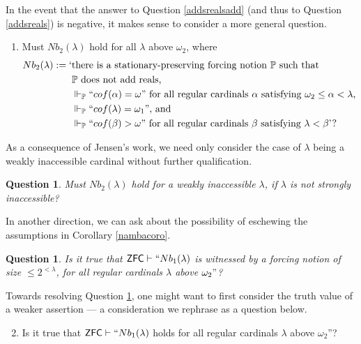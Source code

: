 \documentclass[12pt, twoside]{memoir}
\numberwithin{equation}{section}
\newtheorem{ques}[thm]{Question}
\theoremstyle{definition}
\theoremstyle{remark}
\theoremstyle{definition}
\theoremstyle{definition}
\theoremstyle{definition}
\theoremstyle{remark}
\begin{document}
In the event that the answer to Question \ref{addsrealsadd} (and thus to Question \ref{addsreals}) is negative, it makes sense to consider a more general question.

\begin{enumerate}[label=(Q\arabic*)]
    \item Must $Nb_2(\lambda)$ hold for all $\lambda$ above $\omega_2$, where 
    \begin{align*}
        Nb_2(\lambda) := \text{`} & \text{there is a stationary-preserving forcing notion } \mathbb{P} \text{ such that} \\ 
        & \mathbb{P} \text{ does not add reals,} \\
        & \Vdash_{\mathbb{P}} ``cof(\alpha) = \omega" \text{ for all regular cardinals } \alpha \text{ satisfying } \omega_2 \leq \alpha < \lambda \text{,} \\
        & \Vdash_{\mathbb{P}} ``cof(\lambda) = \omega_1" \text{, and} \\
        & \Vdash_{\mathbb{P}} ``cof(\beta) > \omega" \text{ for all regular cardinals } \beta \text{ satisfying } \lambda < \beta \text{'?}
\end{align*}
\end{enumerate}

As a consequence of Jensen's work, we need only consider the case of $\lambda$ being a weakly inaccessible cardinal without further qualification.

\begin{ques}\label{q428}
Must $Nb_2(\lambda)$ hold for a weakly inaccessible $\lambda$, if $\lambda$ is not strongly inaccessible?
\end{ques}

In another direction, we can ask about the possibility of eschewing the assumptions in Corollary \ref{nambacoro}.

\begin{ques}\label{inzfc}
Is it true that $\mathsf{ZFC} \vdash ``Nb_1(\lambda)$ is witnessed by a forcing notion of size $\leq 2^{<\lambda}$, for all regular cardinals $\lambda$ above $\omega_2"$?
\end{ques}

Towards resolving Question \ref{inzfc}, one might want to first consider the truth value of a weaker assertion --- a consideration we rephrase as a question below.

\begin{enumerate}[label=(Q\arabic*)]
    \setcounter{enumi}{1}
    \item\label{newq2} Is it true that $\mathsf{ZFC} \vdash ``Nb_1(\lambda)$ holds for all regular cardinals $\lambda$ above $\omega_2$''?
\end{enumerate}
\end{document}
